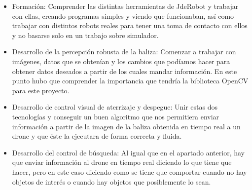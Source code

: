 \begin{itemize}
\item{Formaci\'on:} Comprender las distintas herramientas de JdeRobot y trabajar con ellas, creando programas simples y viendo que funcionaban, as\'i como trabajar con distintos robots reales para tener una toma de contacto con ellos y no basarse solo en un trabajo sobre simulador. 

\item{Desarrollo de la percepci\'on robusta de la baliza:} Comenzar a trabajar con im\'agenes, datos que se obten\'ian y los cambios que pod\'iamos hacer para obtener datos deseados a partir de los cuales mandar informaci\'on. En este punto hubo que comprender la importancia que tendr\'ia la biblioteca OpenCV para este proyecto.

\item{Desarrollo de control visual de aterrizaje y despegue:} Unir estas dos tecnolog\'ias y conseguir un buen algoritmo que nos permitiera enviar informaci\'on a partir de la imagen de la baliza obtenida en tiempo real a un drone y que \'este la ejecutara de forma correcta y fluida.  

\item{Desarrollo del control de b\'usqueda:} Al igual que en el apartado anterior, hay que enviar informaci\'on al drone en tiempo real diciendo lo que tiene que hacer, pero en este caso diciendo como se tiene que comportar cuando no hay objetos de inter\'es o cuando hay objetos que posiblemente lo sean. 


\end{itemize}






























